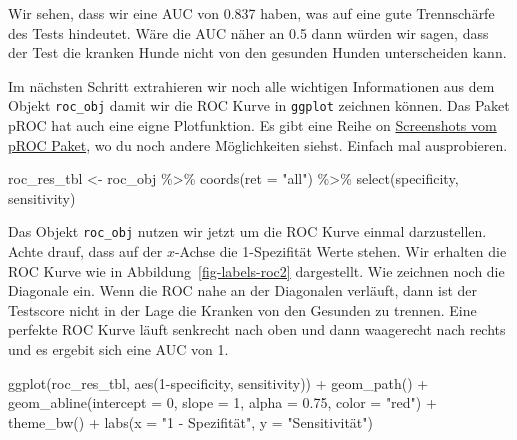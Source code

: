 \documentclass[
  letterpaper,
]{scrbook}
\newenvironment{Shaded}{\begin{snugshade}}{\end{snugshade}}
\newcommand{\AttributeTok}[1]{\textcolor[rgb]{0.40,0.45,0.13}{#1}}
\newcommand{\DecValTok}[1]{\textcolor[rgb]{0.68,0.00,0.00}{#1}}
\newcommand{\FloatTok}[1]{\textcolor[rgb]{0.68,0.00,0.00}{#1}}
\newcommand{\FunctionTok}[1]{\textcolor[rgb]{0.28,0.35,0.67}{#1}}
\newcommand{\NormalTok}[1]{\textcolor[rgb]{0.00,0.23,0.31}{#1}}
\newcommand{\OtherTok}[1]{\textcolor[rgb]{0.00,0.23,0.31}{#1}}
\newcommand{\SpecialCharTok}[1]{\textcolor[rgb]{0.37,0.37,0.37}{#1}}
\newcommand{\StringTok}[1]{\textcolor[rgb]{0.13,0.47,0.30}{#1}}
\begin{document}
Wir sehen, dass wir eine AUC von 0.837 haben, was auf eine gute
Trennschärfe des Tests hindeutet. Wäre die AUC näher an 0.5 dann würden
wir sagen, dass der Test die kranken Hunde nicht von den gesunden Hunden
unterscheiden kann.

Im nächsten Schritt extrahieren wir noch alle wichtigen Informationen
aus dem Objekt \texttt{roc\_obj} damit wir die ROC Kurve in
\texttt{ggplot} zeichnen können. Das Paket pROC hat auch eine eigne
Plotfunktion. Es gibt eine Reihe on
\href{https://web.expasy.org/pROC/screenshots.html}{Screenshots vom pROC
Paket}, wo du noch andere Möglichkeiten siehst. Einfach mal
ausprobieren.

\begin{Shaded}
\begin{Highlighting}[]
\NormalTok{roc\_res\_tbl }\OtherTok{\textless{}{-}}\NormalTok{ roc\_obj }\SpecialCharTok{\%\textgreater{}\%} 
  \FunctionTok{coords}\NormalTok{(}\AttributeTok{ret =} \StringTok{"all"}\NormalTok{) }\SpecialCharTok{\%\textgreater{}\%} 
  \FunctionTok{select}\NormalTok{(specificity, sensitivity)}
\end{Highlighting}
\end{Shaded}

Das Objekt \texttt{roc\_obj} nutzen wir jetzt um die ROC Kurve einmal
darzustellen. Achte drauf, dass auf der \(x\)-Achse die 1-Spezifität
Werte stehen. Wir erhalten die ROC Kurve wie in
Abbildung~\ref{fig-labels-roc2} dargestellt. Wie zeichnen noch die
Diagonale ein. Wenn die ROC nahe an der Diagonalen verläuft, dann ist
der Testscore nicht in der Lage die Kranken von den Gesunden zu trennen.
Eine perfekte ROC Kurve läuft senkrecht nach oben und dann waagerecht
nach rechts und es ergebit sich eine AUC von 1.

\begin{Shaded}
\begin{Highlighting}[]
\FunctionTok{ggplot}\NormalTok{(roc\_res\_tbl, }\FunctionTok{aes}\NormalTok{(}\DecValTok{1}\SpecialCharTok{{-}}\NormalTok{specificity, sensitivity)) }\SpecialCharTok{+}
  \FunctionTok{geom\_path}\NormalTok{() }\SpecialCharTok{+}
  \FunctionTok{geom\_abline}\NormalTok{(}\AttributeTok{intercept =} \DecValTok{0}\NormalTok{, }\AttributeTok{slope =} \DecValTok{1}\NormalTok{, }\AttributeTok{alpha =} \FloatTok{0.75}\NormalTok{, }\AttributeTok{color =} \StringTok{"red"}\NormalTok{) }\SpecialCharTok{+}
  \FunctionTok{theme\_bw}\NormalTok{() }\SpecialCharTok{+}
  \FunctionTok{labs}\NormalTok{(}\AttributeTok{x =} \StringTok{"1 {-} Spezifität"}\NormalTok{, }\AttributeTok{y =} \StringTok{"Sensitivität"}\NormalTok{)}
\end{Highlighting}
\end{Shaded}
\end{document}
